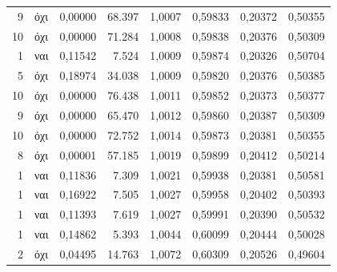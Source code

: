 {\begin{longtable}{@{}rlrrrrrr@{}}
9 & όχι & 0,00000 & 68.397 & 1,0007 & 0,59833 & 0,20372 & 0,50355 \\
10 & όχι & 0,00000 & 71.284 & 1,0008 & 0,59838 & 0,20376 & 0,50309 \\
1 & ναι & 0,11542 & 7.524 & 1,0009 & 0,59874 & 0,20326 & 0,50704 \\
5 & όχι & 0,18974 & 34.038 & 1,0009 & 0,59820 & 0,20376 & 0,50385 \\
10 & όχι & 0,00000 & 76.438 & 1,0011 & 0,59852 & 0,20373 & 0,50377 \\
9 & όχι & 0,00000 & 65.470 & 1,0012 & 0,59860 & 0,20387 & 0,50309 \\
10 & όχι & 0,00000 & 72.752 & 1,0014 & 0,59873 & 0,20381 & 0,50355 \\
8 & όχι & 0,00001 & 57.185 & 1,0019 & 0,59899 & 0,20412 & 0,50214 \\
1 & ναι & 0,11836 & 7.309 & 1,0021 & 0,59938 & 0,20381 & 0,50581 \\
1 & ναι & 0,16922 & 7.505 & 1,0027 & 0,59958 & 0,20402 & 0,50393 \\
1 & ναι & 0,11393 & 7.619 & 1,0027 & 0,59991 & 0,20390 & 0,50532 \\
1 & ναι & 0,14862 & 5.393 & 1,0044 & 0,60099 & 0,20444 & 0,50028 \\
2 & όχι & 0,04495 & 14.763 & 1,0072 & 0,60309 & 0,20526 & 0,49604 \\
\end{longtable}
}

